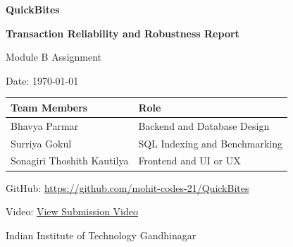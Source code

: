 \documentclass[a4paper, 11pt]{article}
\begin{document}
\begin{titlepage}
    \centering
    \vspace*{4.2cm}

    {\Huge \bfseries QuickBites \par}
    \vspace{0.2cm}
    {\Large \bfseries Transaction Reliability and Robustness Report \par}
    \vspace{0.7cm}

    {\large Module B Assignment \par}
    {\large Date: \today \par}
    \vspace{1.1cm}

    \begin{center}
    \renewcommand{\arraystretch}{1.5}
    \begin{tabular}{|p{7.2cm}|p{8.0cm}|}
    \hline
    \rowcolor{HeaderGray}
    \textbf{Team Members} & \textbf{Role} \\ \hline
    Bhavya Parmar & Backend and Database Design \\ \hline
    Surriya Gokul & SQL Indexing and Benchmarking \\ \hline
    Sonagiri Thoshith Kautilya & Frontend and UI or UX \\ \hline
    \end{tabular}
    \end{center}
    \vspace{0.9cm}

    {\large GitHub: \href{https://github.com/mohit-codes-21/QuickBites}{https://github.com/mohit-codes-21/QuickBites} \par}
    {\large Video: \href{https://drive.google.com/file/d/11_qTASPAAZiH_r3rJKdd1T1OuKAl3c3_/view?usp=sharing}{View Submission Video} \par}
    \vspace{1.5cm}

    {\large Indian Institute of Technology Gandhinagar \par}
    \vfill
\end{titlepage}

\newpage
\tableofcontents
\newpage

\end{document}
